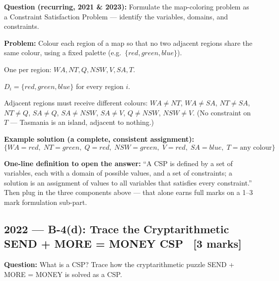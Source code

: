 \documentclass[12pt, a4paper]{article}
\newenvironment{solutionbox}{\begin{mdframed}[style=solutionframe]}{\end{mdframed}}
\newenvironment{answerbox}{\begin{mdframed}[style=answerframe]}{\end{mdframed}}
\begin{document}
\begin{solutionbox}
\textbf{Question (recurring, 2021 \& 2023):} Formulate the map-coloring problem as a Constraint Satisfaction Problem — identify the variables, domains, and constraints.
\end{solutionbox}

\noindent\textbf{Problem:} Colour each region of a map so that no two adjacent regions share the same colour, using a fixed palette (e.g.\ $\{red, green, blue\}$).

\begin{description}[leftmargin=3.4cm, labelwidth=3.2cm, labelsep=0.2cm]
  \item[\textbf{Variables:}] One per region: $WA, NT, Q, NSW, V, SA, T$.
  \item[\textbf{Domains:}] $D_i = \{red, green, blue\}$ for every region $i$.
  \item[\textbf{Constraints (binary):}] Adjacent regions must receive different colours: $WA \neq NT$, $WA \neq SA$, $NT \neq SA$, $NT \neq Q$, $SA \neq Q$, $SA \neq NSW$, $SA \neq V$, $Q \neq NSW$, $NSW \neq V$. (No constraint on $T$ — Tasmania is an island, adjacent to nothing.)
\end{description}

\noindent\textbf{Example solution (a complete, consistent assignment):}
$$\{WA{=}red,\; NT{=}green,\; Q{=}red,\; NSW{=}green,\; V{=}red,\; SA{=}blue,\; T{=}\text{any colour}\}$$

\begin{answerbox}
\textbf{One-line definition to open the answer:} ``A CSP is defined by a set of variables, each with a domain of possible values, and a set of constraints; a solution is an assignment of values to all variables that satisfies every constraint.'' Then plug in the three components above — that alone earns full marks on a 1--3 mark formulation sub-part.
\end{answerbox}

\subsection{2022 — B-4(d): Trace the Cryptarithmetic SEND + MORE = MONEY CSP \ [3 marks]}

\begin{solutionbox}
\textbf{Question:} What is a CSP? Trace how the cryptarithmetic puzzle SEND + MORE = MONEY is solved as a CSP.
\end{solutionbox}
\end{document}

